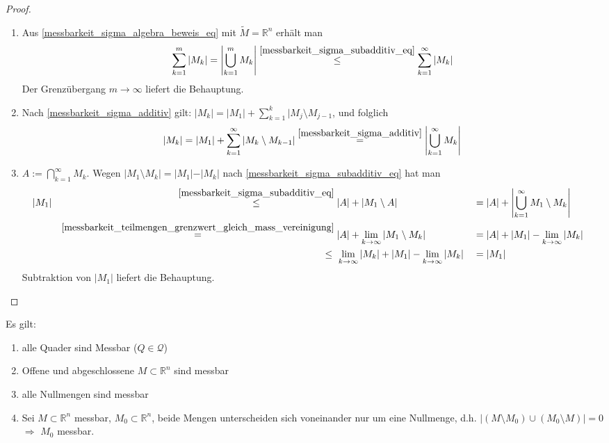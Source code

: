 \begin{proof}\hspace*{0pt}
	\begin{enumerate}[label={\alph*)}]
		\item Aus \eqref{messbarkeit_sigma_algebra_beweis_eq} mit $\tilde{M} = \mathbb{R}^n$ erhält man \begin{align*}
			\sum_{k=1}^{m} \vert M_k\vert = \left\vert\bigcup_{k=1}^m M_k\right\vert \overset{\eqref{messbarkeit_sigma_subadditiv_eq}}{\le} \sum_{k=1}^\infty \vert M_k\vert
		\end{align*}
		Der Grenzübergang $m\to\infty$ liefert die Behauptung.
		
		\item Nach \ref{messbarkeit_sigma_additiv} gilt: $\vert M_k\vert = \vert M_1 \vert + \sum_{k=1}^k \vert M_j\setminus M_{j-1}$, und folglich \begin{align*}
			\vert M_k\vert = \vert M_1 \vert + \sum_{k=1}^\infty \vert M_k\setminus M_{k-1}\vert \overset{\ref{messbarkeit_sigma_additiv}}{=} \left\vert \bigcup_{k=1}^\infty M_k\right\vert
		\end{align*}
		
		\item $A:= \bigcap_{k=1}^\infty M_k$. Wegen $\vert M_1\setminus M_k\vert = \vert M_1 \vert - \vert M_k\vert$ nach \eqref{messbarkeit_sigma_subadditiv_eq} hat man \begin{alignat*}{5}
			&\vert M_1\vert &\;\overset{\eqref{messbarkeit_sigma_subadditiv_eq}}{\le}\;& \vert A \vert + \vert M_1 \setminus A\vert &\;=\;& \vert A \vert + \left\vert \bigcup_{k=1}^\infty M_1 \setminus M_k\right\vert\\ &&\overset{\ref{messbarkeit_teilmengen_grenzwert_gleich_mass_vereinigung}}{=}\;& \vert A \vert + \lim\limits_{k\to\infty} \vert M_1 \setminus M_k\vert&=\;& \vert A \vert + \vert M_1\vert - \lim\limits_{k\to\infty} \vert M_k\vert \\
			&&\le\;\,& \lim\limits_{k\to\infty} \vert M_k\vert + \vert M_1\vert - \lim\limits_{k\to\infty} \vert M_k\vert &=\;& \vert M_1\vert&
		\end{alignat*}
		Subtraktion von $\vert M_1\vert$ liefert die Behauptung.
	\end{enumerate}
\end{proof}

\begin{proposition}
	Es gilt: \begin{enumerate}[label={(\alph*)}]
		\item alle Quader sind Messbar ($Q\in\mathcal{Q}$)
		\item Offene und abgeschlossene $M\subset\mathbb{R}^n$ sind messbar
		\item alle Nullmengen sind messbar
		\item Sei $M\subset\mathbb{R}^n$ messbar, $M_0\subset\mathbb{R}^n$, beide Mengen unterscheiden sich voneinander nur um eine Nullmenge, d.h. $\vert (M\setminus M_0)\cup (M_0\setminus M)\vert = 0$ \\
		$\Rightarrow$ $M_0$ messbar.
	\end{enumerate}
\end{proposition}

